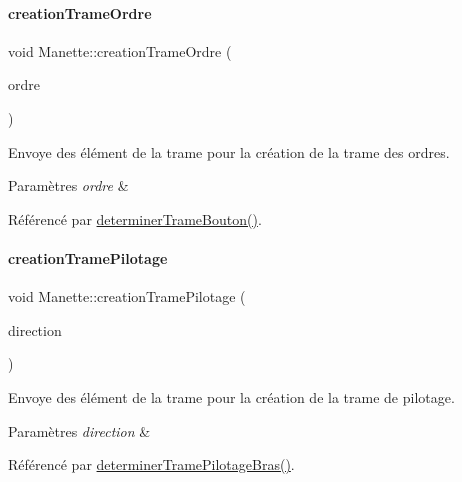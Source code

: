 \paragraph{\texorpdfstring{creation\+Trame\+Ordre}{creationTrameOrdre}}
{\footnotesize\ttfamily void Manette\+::creation\+Trame\+Ordre (\begin{DoxyParamCaption}\item[{Q\+String}]{ordre }\end{DoxyParamCaption})\hspace{0.3cm}{\ttfamily [signal]}}



Envoye des élément de la trame pour la création de la trame des ordres. 


\begin{DoxyParams}{Paramètres}
{\em ordre} & \\
\hline
\end{DoxyParams}


Référencé par \hyperlink{manette_8cpp_source_l00393}{determiner\+Trame\+Bouton()}.

\mbox{\label{class_manette_a39de9cbde743771debc15501f8f8c154}} 
\paragraph{\texorpdfstring{creation\+Trame\+Pilotage}{creationTramePilotage}}
{\footnotesize\ttfamily void Manette\+::creation\+Trame\+Pilotage (\begin{DoxyParamCaption}\item[{Q\+String}]{direction }\end{DoxyParamCaption})\hspace{0.3cm}{\ttfamily [signal]}}



Envoye des élément de la trame pour la création de la trame de pilotage. 


\begin{DoxyParams}{Paramètres}
{\em direction} & \\
\hline
\end{DoxyParams}


Référencé par \hyperlink{manette_8cpp_source_l00375}{determiner\+Trame\+Pilotage\+Bras()}.

\mbox{\label{class_manette_a16cb602cf7001f78b115f395fad47586}} 
